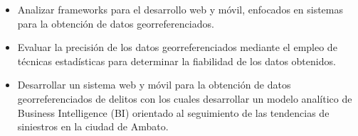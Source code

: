 
\begin{itemize}
      \item Analizar frameworks para el desarrollo web y móvil, enfocados en sistemas para la obtención
            de datos georreferenciados.
      \item Evaluar la precisión de los datos georreferenciados mediante el empleo de técnicas
            estadísticas para determinar la fiabilidad de los datos obtenidos.
      \item Desarrollar  un sistema web y móvil para la obtención de datos
            georreferenciados de delitos con los cuales desarrollar un modelo analítico de
            Business Intelligence (BI) orientado al seguimiento de las tendencias de siniestros
            en la ciudad de Ambato.
\end{itemize}